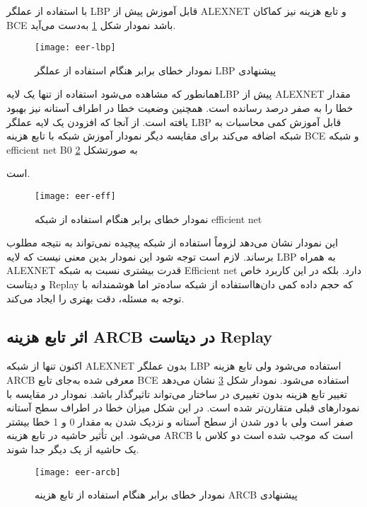 با استفاده از عملگر LBP قابل آموزش پیش از ALEXNET و تابع هزینه نیز کماکان BCE باشد نمودار شکل
\ref{fig:eer-lbp}
به‌دست می‌آید.
\begin{figure}[h]
	\centerline{\texttt{[image: eer-lbp]}}
	\caption{نمودار خطای برابر هنگام استفاده از عملگر LBP پیشنهادی}
	\label{fig:eer-lbp}
\end{figure}
همانطور که مشاهده می‌شود استفاده از تنها یک لایهLBP پیش از ALEXNET مقدار خطا را به صفر درصد رسانده است. همچنین وضعیت خطا در اطراف آستانه نیز بهبود یافته است.
از آنجا که افزودن یک لایه عملگر LBP قابل آموزش کمی محاسبات به شبکه اضافه می‌کند برای مقایسه دیگر نمودار آموزش شبکه با تابع هزینه BCE و شبکه efficient net B0 به صورتشکل 
\ref{fig:eer-eff}

است.
\begin{figure}[h]
	\centerline{\texttt{[image: eer-eff]}}
	\caption{نمودار خطای برابر هنگام استفاده از شبکه efficient net}
	\label{fig:eer-eff}
\end{figure}

این نمودار نشان می‌دهد لزوماً استفاده از شبکه پیچیده نمی‌تواند به نتیجه مطلوب برساند. 
لازم است توجه شود این نمودار بدین معنی نیست که لایه LBP به همراه ALEXNET قدرت بیشتری نسبت به شبکه Efficient net دارد. بلکه در این کاربرد خاص و دیتاست Replay که حجم داده کمی دان‌هااستفاده از شبکه ساده‌تر اما هوشمندانه با توجه به مسئله، دقت بهتری را ایجاد می‌کند.
\subsection{اثر تابع هزینه ARCB در دیتاست Replay}
اکنون تنها از شبکه ALEXNET بدون عملگر LBP استفاده می‌شود ولی تابع هزینه ARCB معرفی شده به‌جای تابع BCE استفاده می‌شود. نمودار شکل
\ref{fig:eer-arcb}
نشان می‌دهد تغییر تابع هزینه بدون تغییری در ساختار می‌تواند تاثیرگذار باشد. نمودار در مقایسه با نمودارهای قبلی متقارن‌تر شده است. در این شکل میزان خطا در اطراف سطح آستانه صفر است ولی با دور شدن از سطح آستانه و نزدیک شدن به مقدار 0 و 1 خطا بیشتر می‌شود. این تأثیر حاشیه در تابع هزینه ARCB است که موجب شده است دو کلاس با یک حاشیه از یک دیگر جدا شوند.

\begin{figure}[h]
	\centerline{\texttt{[image: eer-arcb]}}
	\caption{نمودار خطای برابر هنگام استفاده از تابع هزینه ARCB پیشنهادی}
	\label{fig:eer-arcb}
\end{figure}


